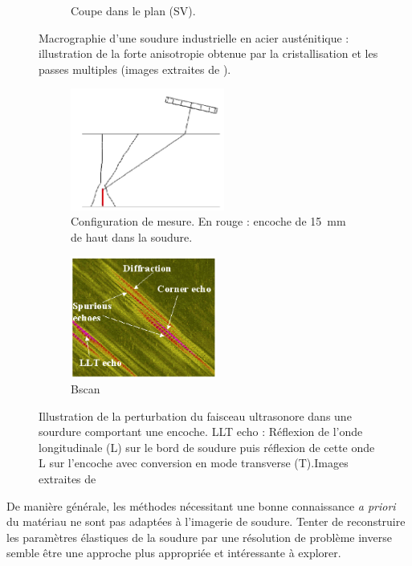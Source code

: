 \begin{figure}[!h]
\begin{subfigure}[c]{0.25\textwidth}
        \caption{Coupe dans le plan (SV).}
    \end{subfigure}
    \caption{ Macrographie d'une soudure industrielle en acier austénitique  : illustration de la forte anisotropie obtenue par la cristallisation et les passes multiples (images extraites de \cite{chassignole} ). \label{soudure}}
\end{figure}

\begin{figure}[!h]
    \centering
    \begin{subfigure}[c]{0.3\textwidth}
    	\centering
        \includegraphics[height=4cm]{img/chassignole_echos_config.png}
        \caption{ Configuration de mesure. En rouge : encoche de 15~mm de haut dans la soudure.}
    \end{subfigure}
    \hspace{1cm}
    \begin{subfigure}[c]{0.3\textwidth}
    	\centering
        \includegraphics[height=4cm]{img/chassignole_echos.png}
        \caption{Bscan}
    \end{subfigure}
    \caption{Illustration de la perturbation du faisceau ultrasonore dans une sourdure comportant une encoche.  LLT echo : Réflexion de l'onde longitudinale (L) sur le bord de soudure puis réflexion de cette onde L sur l'encoche avec conversion en mode transverse (T).Images extraites de \cite{chassignole_beam}  }\label{echos}
\end{figure}

De manière générale, les méthodes nécessitant une bonne connaissance \emph{a priori} du matériau ne sont pas adaptées à l'imagerie de soudure. Tenter de reconstruire les paramètres élastiques de la soudure par une résolution de problème inverse semble être une approche plus appropriée et intéressante à explorer.






